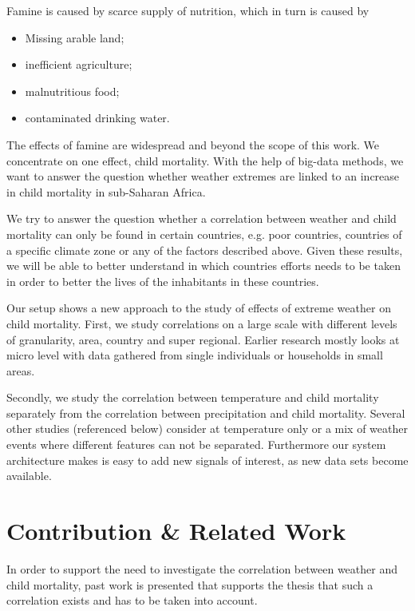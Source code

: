 \documentclass[
10pt, %
a4paper, %
oneside, %
headinclude,footinclude, %
useAMS,
usenatbib
]{template/mn2e}  %
\begin{document}
Famine is caused by scarce supply of nutrition, which in turn is caused by
\begin{itemize}
    \item Missing arable land;
    \item inefficient agriculture;
    \item malnutritious food;
    \item contaminated drinking water.
\end{itemize}

The effects of famine are widespread and beyond the scope of this work. We concentrate on one effect, child mortality. With the help of big-data methods, we want to answer the question whether weather extremes are linked to an increase in child mortality in sub-Saharan Africa.

We try to answer the question whether a correlation between weather and child mortality can only be found in certain countries, e.g. poor countries, countries of a specific climate zone or any of the factors described above. Given these results, we will be able to better understand in which countries efforts needs to be taken in order to better the lives of the inhabitants in these countries.

Our setup shows a new approach to the study of effects of extreme weather on child mortality. First, we study correlations on a large scale with different levels of granularity, area, country and super regional. Earlier research mostly looks at micro level with data gathered from single individuals or households in small areas.

Secondly, we study the correlation between temperature and child mortality separately from the correlation between precipitation and child mortality. Several other studies (referenced below) consider at temperature only or a mix of weather events where different features can not be separated. Furthermore our system architecture makes is easy to add new signals of interest, as new data sets become available.

\section{Contribution \& Related Work}
In order to support the need to investigate the correlation between weather and child mortality, past work is presented that supports the thesis that such a correlation exists and has to be taken into account.
\end{document}
